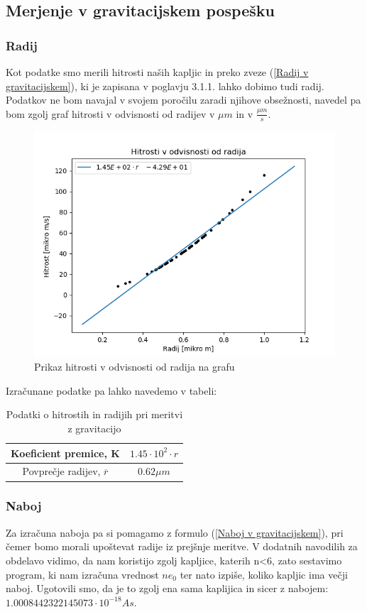 \documentclass[11pt, a4paper]{article}
\theoremstyle{definition}
\theoremstyle{example}
\theoremstyle{izrek}
\begin{document}
\pagebreak
\subsection{Merjenje v gravitacijskem pospešku}
\subsubsection{Radij}
Kot podatke smo merili hitrosti naših kapljic in preko zveze (\ref{Radij v gravitacijskem}), ki je zapisana v poglavju 3.1.1. lahko dobimo tudi radij.
Podatkov ne bom navajal v svojem poročilu zaradi njihove obsežnosti, navedel pa bom zgolj graf hitrosti v odvisnosti od radijev v $\mu m$ in v $\frac{\mu m}{s}$. 
\begin{figure}[H]
	\centering
    \includegraphics[width=12cm]{Hitrosti.png}
    \caption{Prikaz hitrosti v odvisnosti od radija na grafu}
\end{figure}

Izračunane podatke pa lahko navedemo v tabeli: 
\begin{table}[h]
	\centering
	\begin{tabular}{|c|c|}
	\hline
	\hline
	Koeficient premice, K & $1.45 \cdot 10^{2} \cdot r $\\
	\hline
	Povprečje radijev, $\overline{r}$ & $0.62 \mu m$ \\
	\hline
	\end{tabular}
	\caption{Podatki o hitrostih in radijih pri meritvi z gravitacijo}		
\end{table}

\subsubsection{Naboj}
Za izračuna naboja pa si pomagamo z formulo (\ref{Naboj v gravitacijskem}), pri čemer bomo morali upoštevat radije iz prejšnje meritve. 
V dodatnih navodilih za obdelavo vidimo, da nam koristijo zgolj kapljice, katerih n<6, zato sestavimo program, ki nam izračuna vrednost $ne_0$ ter nato izpiše, koliko kapljic ima večji naboj. Ugotovili smo, da je to zgolj ena sama kaplijica in sicer z nabojem: $1.0008442322145073\cdot 10^{-18} As$.
\end{document}
